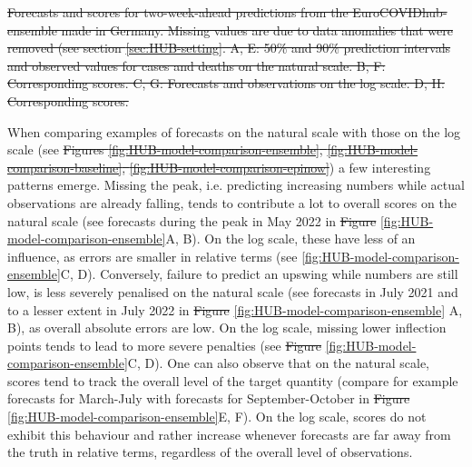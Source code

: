 \documentclass[10pt,letterpaper]{article} %
\providecommand{\DIFaddtex}[1]{{\protect\color{blue}\uwave{#1}}} %
\providecommand{\DIFdeltex}[1]{{\protect\color{red}\sout{#1}}}                      %
\providecommand{\DIFaddbegin}{} %
\providecommand{\DIFaddend}{} %
\providecommand{\DIFdelbegin}{} %
\providecommand{\DIFdelend}{} %
\providecommand{\DIFdelFL}[1]{\DIFdel{#1}} %
\providecommand{\DIFadd}[1]{\texorpdfstring{\DIFaddtex{#1}}{#1}} %
\providecommand{\DIFdel}[1]{\texorpdfstring{\DIFdeltex{#1}}{}} %
\newcommand{\DIFscaledelfig}{0.5}
\newlength{\DIFdelgraphicswidth} %
\newlength{\DIFdelgraphicsheight} %
\newcommand{\DIFaddincludegraphics}[2][]{{\color{blue}\fbox{\DIFOincludegraphics[#1]{#2}}}} %
\newcommand{\DIFdelincludegraphics}[2][]{%
\sbox{\DIFdelgraphicsbox}{\DIFOincludegraphics[#1]{#2}}%
\settoboxwidth{\DIFdelgraphicswidth}{\DIFdelgraphicsbox} %
\settoboxtotalheight{\DIFdelgraphicsheight}{\DIFdelgraphicsbox} %
\scalebox{\DIFscaledelfig}{%
\parbox[b]{\DIFdelgraphicswidth}{\usebox{\DIFdelgraphicsbox}\\[-\baselineskip] \rule{\DIFdelgraphicswidth}{0em}}\llap{\resizebox{\DIFdelgraphicswidth}{\DIFdelgraphicsheight}{%
\setlength{\unitlength}{\DIFdelgraphicswidth}%
\begin{picture}(1,1)%
\thicklines\linethickness{2pt} %
{\color[rgb]{1,0,0}\put(0,0){\framebox(1,1){}}}%
{\color[rgb]{1,0,0}\put(0,0){\line( 1,1){1}}}%
{\color[rgb]{1,0,0}\put(0,1){\line(1,-1){1}}}%
\end{picture}%
}\hspace*{3pt}}} %
} %
\DeclareRobustCommand{\DIFaddbegin}{\DIFOaddbegin \let\includegraphics\DIFaddincludegraphics} %
\DeclareRobustCommand{\DIFaddend}{\DIFOaddend \let\includegraphics\DIFOincludegraphics} %
\DeclareRobustCommand{\DIFdelbegin}{\DIFOdelbegin \let\includegraphics\DIFdelincludegraphics} %
\DeclareRobustCommand{\DIFdelend}{\DIFOaddend \let\includegraphics\DIFOincludegraphics} %
\begin{document}
\DIFdelbegin %
{%
\DIFdelFL{Forecasts and scores for two-week-ahead predictions from the EuroCOVIDhub-ensemble made in Germany. Missing values are due to data anomalies that were removed (see section \ref{sec:HUB-setting}. 
    A, E: 50\% and 90\% prediction intervals and observed values for cases and deaths on the natural scale. B, F: Corresponding scores. C, G: Forecasts and observations on the log scale. D, H: Corresponding scores. 
    }}

\DIFdelend When comparing examples of forecasts on the natural scale with those on the log scale (see \DIFdelbegin \DIFdel{Figures \ref{fig:HUB-model-comparison-ensemble}, \ref{fig:HUB-model-comparison-baseline}, \ref{fig:HUB-model-comparison-epinow}}\DIFdelend \DIFaddbegin \DIFadd{Fig \ref{fig:HUB-model-comparison-ensemble}, }\DIFadd{, }\DIFaddend ) a few interesting patterns emerge. Missing the peak, i.e. predicting increasing numbers while actual observations are already falling, tends to contribute a lot to overall scores on the natural scale (see forecasts during the peak in May 2022 in \DIFdelbegin \DIFdel{Figure }\DIFdelend \DIFaddbegin \DIFadd{Fig }\DIFaddend \ref{fig:HUB-model-comparison-ensemble}A, B). On the log scale, these have less of an influence, as errors are smaller in relative terms (see \ref{fig:HUB-model-comparison-ensemble}C, D). Conversely, failure to predict an upswing while numbers are still low, is less severely penalised on the natural scale (see forecasts in July 2021 and to a lesser extent in July 2022 in \DIFdelbegin \DIFdel{Figure }\DIFdelend \DIFaddbegin \DIFadd{Fig }\DIFaddend \ref{fig:HUB-model-comparison-ensemble} A, B), as overall absolute errors are low. On the log scale, missing lower inflection points tends to lead to more severe penalties (see \DIFdelbegin \DIFdel{Figure }\DIFdelend \DIFaddbegin \DIFadd{Fig }\DIFaddend \ref{fig:HUB-model-comparison-ensemble}C, D). One can also observe that on the natural scale, scores tend to track the overall level of the target quantity (compare for example forecasts for March-July with forecasts for September-October in \DIFdelbegin \DIFdel{Figure }\DIFdelend \DIFaddbegin \DIFadd{Fig }\DIFaddend \ref{fig:HUB-model-comparison-ensemble}E, F). On the log scale, scores do not exhibit this behaviour and rather increase whenever forecasts are far away from the truth in relative terms, regardless of the overall level of observations. 
\end{document}
